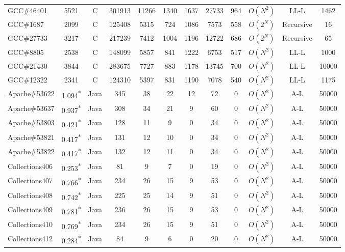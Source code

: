 \begin{table}[h!]
\begin{tabular}{lccccccccccc}
    GCC\#46401        &  5521  & C  & 301913 & 11266 & 1340 & 1637 & 27733 & 964 & $O(N^{2})$ & LL-L & 1462 \\
    GCC\#1687         &  2099  & C  & 125408 & 5315  & 724 & 1086  & 7573  & 558 & $O(2^{N})$ & Recursive & 16  \\
    GCC\#27733        &  3217  & C  & 217239 & 7412 & 1004 & 1196  & 12722 & 686 & $O(2^{N})$ & Recursive & 65  \\
    GCC\#8805         &  2538  & C  & 148099 & 5857 & 841 & 1222 & 6753 & 517 & $O(N^{2})$ & LL-L & 1000 \\
    GCC\#21430        &  3844  & C  & 283675 & 7727 & 883  & 1178 & 13745 & 700 & $O(N^{2})$ & LL-L & 10000 \\
    GCC\#12322        &  2341  & C  & 124310 & 5397 & 831 & 1190 & 7078 & 540 & $O(N^{2})$ & LL-L & 1175 \\
    \midrule
    \midrule
    Apache\#53622     & 1.094\textsuperscript{*}  & Java  & 345 & 38 & 22 & 12 & 72 & 0 & $O(N^{2})$ & A-L & 50000    \\
    Apache\#53637     & 0.937\textsuperscript{*}  & Java  & 308 & 34 & 21 & 9  & 60 & 0 & $O(N^{2})$ & A-L & 50000 \\
    Apache\#53803     & 0.421\textsuperscript{*}  & Java  & 128 & 11 & 9  & 0  & 34 & 0  & $O(N^{2})$ & A-L & 50000     \\
    Apache\#53821     & 0.417\textsuperscript{*}  & Java  & 131 & 12 & 10 & 0  & 34 & 0  & $O(N^{2})$ & A-L & 50000      \\
    Apache\#53822     & 0.417\textsuperscript{*}  & Java  & 132 & 12 & 11 & 0  & 34 & 0  & $O(N^{2})$ & A-L & 50000      \\
    \midrule
    Collections406    & 0.253\textsuperscript{*}  & Java  & 81 & 9 & 7 & 0 & 19 & 0 & $O(N^{2})$ & A-L & 50000      \\
    Collections407    & 0.766\textsuperscript{*}  & Java  & 234 & 26 & 15 & 9 & 53 & 0 & $O(N^{2})$ & A-L & 50000   \\
    Collections408    & 0.742\textsuperscript{*}  & Java  & 225 & 25 & 14 & 9 & 51 & 0 & $O(N^{2})$ & A-L & 50000    \\
    Collections409    & 0.781\textsuperscript{*}  & Java  & 236 & 26 & 15 & 9 & 53 & 0 & $O(N^{2})$ & A-L & 50000     \\
    Collections410    & 0.769\textsuperscript{*} & Java   & 234 & 26 & 15 & 9 & 51 & 0 & $O(N^{2})$ & A-L & 50000    \\
    Collections412    & 0.284\textsuperscript{*}  & Java  & 84 & 9  & 6  & 0  & 20 & 0 & $O(N^{2})$ & A-L & 50000     \\

\end{tabular}
\end{table}
